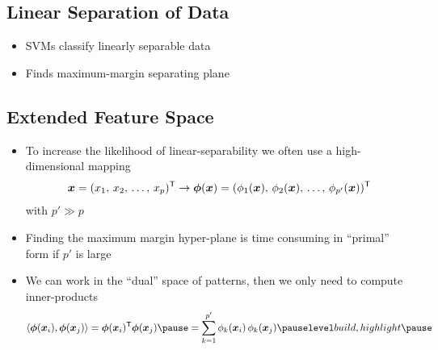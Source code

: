 
\begin{slide}
\section[-2]{Linear Separation of Data}

\pb
\begin{itemize}
\item SVMs classify linearly separable data\pause{}
  \begin{center}
    \pause
  \end{center}
\item Finds maximum-margin separating plane\pauseb
\end{itemize}

\end{slide}


\begin{slide}
\section[-2]{Extended Feature Space}

\begin{PauseHighLight}
  \begin{itemize}
  \item To increase the likelihood of linear-separability we often use a
    high-dimensional mapping
    \begin{align*}
      \bm{x}=(x_1,\,x_2,\,\ldots,\,x_p)^{\textsf{T}} \rightarrow \bm{\phi}(\bm{x}) =
      (\phi_1(\bm{x}),\,\phi_2(\bm{x}),\,\ldots,\,
      \phi_{p'}(\bm{x}))^{\textsf{T}}
    \end{align*}
    with $p'\gg p$\pause
  \item Finding the maximum margin hyper-plane is time consuming in
    ``primal'' form if $p'$ is large\pause
  \item We can work in the ``dual'' space of patterns, then we only need to
    compute inner-products
    \begin{align*}
      \inner{\bm{\phi}(\bm{x}_i)}{\bm{\phi}(\bm{x}_j)} =
      \bm{\phi}(\bm{x}_i)^\tr \bm{\phi}(\bm{x}_j)  \pause
      =  \sum_{k=1}^{p'} \phi_k(\bm{x}_i) \, \phi_k(\bm{x}_j)\pauseb
    \end{align*}
  \end{itemize}
\end{PauseHighLight}

\end{slide}


